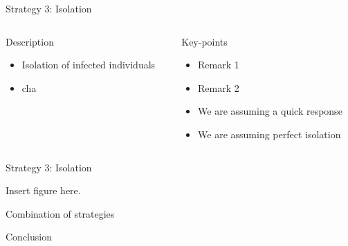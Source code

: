 \documentclass[12pt,handout]{beamer}
\begin{document}
\begin{frame}{Strategy 3: Isolation}

    \begin{columns}[t]
        \begin{column}{.5\textwidth}
        \begin{block}{Description}
        \begin{itemize}
            \item Isolation of infected individuals
            \item cha
        \end{itemize}
        \end{block}
        \end{column}
        \begin{column}{.5\textwidth}
            \begin{block}{Key-points}
            \begin{itemize}
                \item Remark 1
                \item Remark 2
                \item We are assuming a quick response
                \item We are assuming perfect isolation
            \end{itemize}
            \end{block}
        \end{column}
    \end{columns}

\end{frame}

\begin{frame}{Strategy 3: Isolation}

Insert figure here.

\end{frame}


\begin{frame}{Combination of strategies}

\end{frame}

\begin{frame}{Conclusion}

\end{frame}
\end{document}
